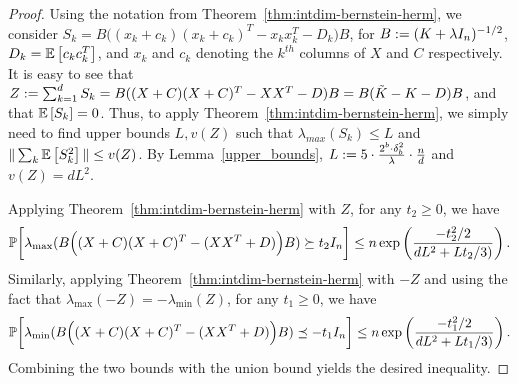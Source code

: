 \documentclass[12pt]{article}
\begin{document}
\begin{proof}
	Using the notation from Theorem~\ref{thm:intdim-bernstein-herm},
	we consider $S_k = B\Big((x_k + c_k)(x_k + c_k)^T  - x_k x_k^T - D_k\Big)B$, for $B\defeq (K+\lambda I_n)^{-1/2}$, $D_k = \expect{}{c_k c_k^T}$, and $x_k$ and $c_k$ denoting the $k^{th}$ columns of $X$ and $C$ respectively.
	It is easy to see that $Z\defeq \sum_{k=1}^d S_k = B((X+C)(X+C)^T - XX^T - D)B = B(\tK - K - D)B$, and that $\expect{}{S_k} = 0$.
	Thus, to apply Theorem~\ref{thm:intdim-bernstein-herm}, we simply need to find upper bounds $L,v(Z)$ such that $\lambda_{max}(S_k) \leq L$ and  $\|\sum_k \expect{}{S_k^2}\| \leq v(Z)$.
	By Lemma~\ref{upper_bounds}, $L \defeq 5 \cdot \frac{2^b \cdot \delta_b^2}{\lambda}\cdot  \frac{n}{d}$ and $v(Z) = dL^2$.
	
	Applying Theorem~\ref{thm:intdim-bernstein-herm} with $Z$, for any $t_2 \geq 0$,
	we have
	\begin{equation*}
	\Prob\bigg[\lambda_{\max}(B\Big((X + C)(X + C)^T - (XX^T+D)\Big)B) \succeq t_2 I_n \bigg] \leq n
	\exp \left( \frac{-t_2^2/2}{dL^2 + Lt_2/3)} \right).
	\end{equation*}
	Similarly, applying Theorem~\ref{thm:intdim-bernstein-herm} with $-Z$ and
	using the fact that $\lambda_{\max}(-Z) = -\lambda_{\min}(Z)$, for any $t_1 \geq 0$,
	we have
	\begin{equation*}
	\Prob\bigg[\lambda_{\min}(B\Big((X + C)(X + C)^T - (XX^T+D)\Big)B) \preceq -t_1 I_n \bigg] \leq n
	\exp \left( \frac{-t_1^2/2}{dL^2 + Lt_1/3)} \right).
	\end{equation*}
	Combining the two bounds with the union bound yields the desired inequality.
\end{proof}
\end{document}
